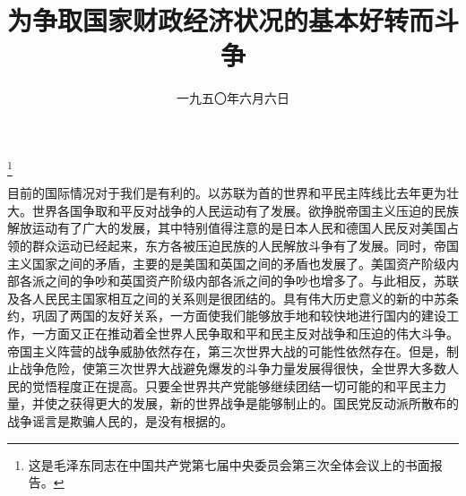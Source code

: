 
\title{为争取国家财政经济状况的基本好转而斗争}
\date{一九五〇年六月六日}
\thanks{这是毛泽东同志在中国共产党第七届中央委员会第三次全体会议上的书面报告。}
\maketitle


目前的国际情况对于我们是有利的。以苏联为首的世界和平民主阵线比去年更为壮大。世界各国争取和平反对战争的人民运动有了发展。欲挣脱帝国主义压迫的民族解放运动有了广大的发展，其中特别值得注意的是日本人民和德国人民反对美国占领的群众运动已经起来，东方各被压迫民族的人民解放斗争有了发展。同时，帝国主义国家之间的矛盾，主要的是美国和英国之间的矛盾也发展了。美国资产阶级内部各派之间的争吵和英国资产阶级内部各派之间的争吵也增多了。与此相反，苏联及各人民民主国家相互之间的关系则是很团结的。具有伟大历史意义的新的中苏条约，巩固了两国的友好关系，一方面使我们能够放手地和较快地进行国内的建设工作，一方面又正在推动着全世界人民争取和平和民主反对战争和压迫的伟大斗争。帝国主义阵营的战争威胁依然存在，第三次世界大战的可能性依然存在。但是，制止战争危险，使第三次世界大战避免爆发的斗争力量发展得很快，全世界大多数人民的觉悟程度正在提高。只要全世界共产党能够继续团结一切可能的和平民主力量，并使之获得更大的发展，新的世界战争是能够制止的。国民党反动派所散布的战争谣言是欺骗人民的，是没有根据的。

